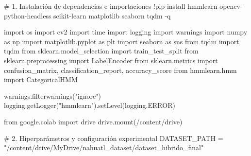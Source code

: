 \documentclass[
  spanish,
  us-letterpaper,
]{scrreprt}
\newenvironment{Shaded}{\begin{snugshade}}{\end{snugshade}}
\newcommand{\CommentTok}[1]{\textcolor[rgb]{0.37,0.37,0.37}{#1}}
\newcommand{\ImportTok}[1]{\textcolor[rgb]{0.00,0.46,0.62}{#1}}
\newcommand{\NormalTok}[1]{\textcolor[rgb]{0.00,0.23,0.31}{#1}}
\newcommand{\OperatorTok}[1]{\textcolor[rgb]{0.37,0.37,0.37}{#1}}
\newcommand{\StringTok}[1]{\textcolor[rgb]{0.13,0.47,0.30}{#1}}
\theoremstyle{definition}
\theoremstyle{remark}
\begin{document}
\label{hmm-config-imports}
\begin{Shaded}
\begin{Highlighting}[]
\CommentTok{\# 1. Instalación de dependencias e importaciones}
\OperatorTok{!}\NormalTok{pip install hmmlearn opencv}\OperatorTok{{-}}\NormalTok{python}\OperatorTok{{-}}\NormalTok{headless scikit}\OperatorTok{{-}}\NormalTok{learn matplotlib seaborn tqdm }\OperatorTok{{-}}\NormalTok{q}

\ImportTok{import}\NormalTok{ os}
\ImportTok{import}\NormalTok{ cv2}
\ImportTok{import}\NormalTok{ time}
\ImportTok{import}\NormalTok{ logging}
\ImportTok{import}\NormalTok{ warnings}
\ImportTok{import}\NormalTok{ numpy }\ImportTok{as}\NormalTok{ np}
\ImportTok{import}\NormalTok{ matplotlib.pyplot }\ImportTok{as}\NormalTok{ plt}
\ImportTok{import}\NormalTok{ seaborn }\ImportTok{as}\NormalTok{ sns}
\ImportTok{from}\NormalTok{ tqdm }\ImportTok{import}\NormalTok{ tqdm}
\ImportTok{from}\NormalTok{ sklearn.model\_selection }\ImportTok{import}\NormalTok{ train\_test\_split}
\ImportTok{from}\NormalTok{ sklearn.preprocessing }\ImportTok{import}\NormalTok{ LabelEncoder}
\ImportTok{from}\NormalTok{ sklearn.metrics }\ImportTok{import}\NormalTok{ confusion\_matrix, classification\_report, accuracy\_score}
\ImportTok{from}\NormalTok{ hmmlearn.hmm }\ImportTok{import}\NormalTok{ CategoricalHMM}

\NormalTok{warnings.filterwarnings(}\StringTok{"ignore"}\NormalTok{)}
\NormalTok{logging.getLogger(}\StringTok{"hmmlearn"}\NormalTok{).setLevel(logging.ERROR)}

\ImportTok{from}\NormalTok{ google.colab }\ImportTok{import}\NormalTok{ drive}
\NormalTok{drive.mount(}\StringTok{\textquotesingle{}/content/drive\textquotesingle{}}\NormalTok{)}

\CommentTok{\# 2. Hiperparámetros y configuración experimental}
\NormalTok{DATASET\_PATH }\OperatorTok{=} \StringTok{"/content/drive/MyDrive/nahuatl\_dataset/dataset\_hibrido\_final"}


\end{Highlighting}
\end{Shaded}
\end{document}

